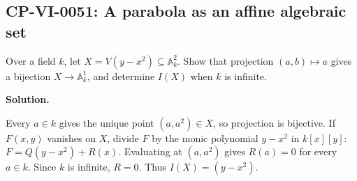 
\subsection*{CP-VI-0051: A parabola as an affine algebraic set}

Over a field $k$, let $X=V(y-x^2)\subseteq \mathbb A_k^2$. Show that projection $(a,b)\mapsto a$ gives a bijection $X\to\mathbb A_k^1$, and determine $I(X)$ when $k$ is infinite.

\medskip
\noindent\textbf{Solution.}

Every $a\in k$ gives the unique point $(a,a^2)\in X$, so projection is bijective. If $F(x,y)$ vanishes on $X$, divide $F$ by the monic polynomial $y-x^2$ in $k[x][y]$: $F=Q(y-x^2)+R(x)$. Evaluating at $(a,a^2)$ gives $R(a)=0$ for every $a\in k$. Since $k$ is infinite, $R=0$. Thus $I(X)=(y-x^2)$.
